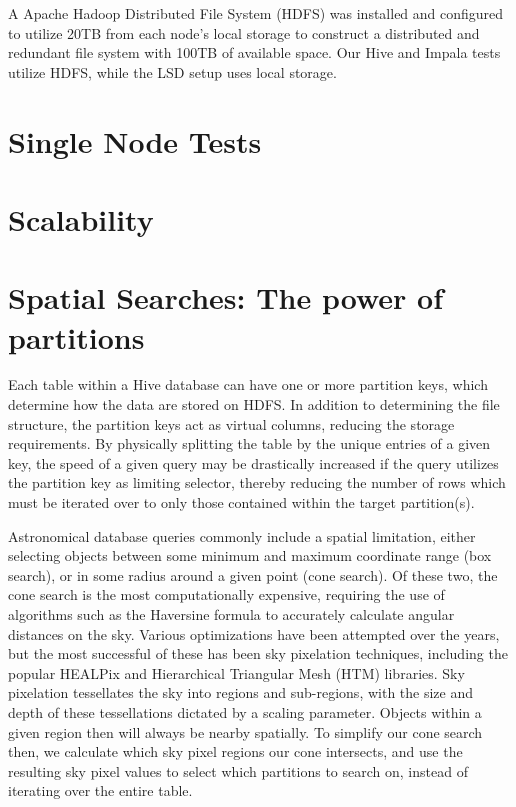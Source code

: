 \documentclass[11pt,twoside]{article}
\begin{document}
A Apache Hadoop Distributed File System (HDFS) was installed and configured to utilize 20TB from each node's local storage to construct a distributed and redundant file system with 100TB of available space.  Our Hive and Impala tests utilize HDFS, while the LSD setup uses local storage.  

\section{Single Node Tests}


\section{Scalability}


\section{Spatial Searches: The power of partitions}
Each table within a Hive database can have one or more partition keys, which determine how the data are stored on HDFS.  In addition to determining the file structure, the partition keys act as virtual columns, reducing the storage requirements.  By physically splitting the table by the unique entries of a given key, the speed of a given query may be drastically increased if the query utilizes the partition key as limiting selector, thereby reducing the number of rows which must be iterated over to only those contained within the target partition(s).

Astronomical database queries commonly include a spatial limitation, either selecting objects between some minimum and maximum coordinate range (box search), or in some radius around a given point (cone search).  Of these two, the cone search is the most computationally expensive, requiring the use of algorithms such as the Haversine formula to accurately calculate angular distances on the sky.  Various optimizations have been attempted over the years, but the most successful of these has been sky pixelation techniques, including the popular HEALPix and Hierarchical Triangular Mesh (HTM) libraries.  Sky pixelation tessellates the sky into regions and sub-regions, with the size and depth of these tessellations dictated by a scaling parameter.  Objects within a given region then will always be nearby spatially.  To simplify our cone search then, we calculate which sky pixel regions our cone intersects, and use the resulting sky pixel values to select which partitions to search on, instead of iterating over the entire table.
\end{document}
